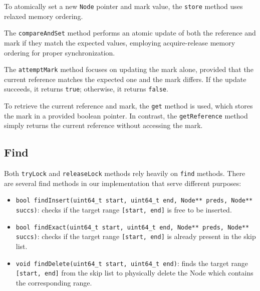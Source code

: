 To atomically set a new \texttt{Node} pointer and mark value, the \texttt{store} method uses relaxed memory ordering.

The \texttt{compareAndSet} method performs an atomic update of both the reference and mark if they match the expected values, employing acquire-release memory ordering for proper synchronization.

The \texttt{attemptMark} method focuses on updating the mark alone, provided that the current reference matches the expected one and the mark differs. If the update succeeds, it returns \texttt{true}; otherwise, it returns \texttt{false}.

To retrieve the current reference and mark, the \texttt{get} method is used, which stores the mark in a provided boolean pointer. In contrast, the \texttt{getReference} method simply returns the current reference without accessing the mark.

\begin{figure}[!p]
    \centering
    
\end{figure}

\clearpage

\subsection{Find}\label{subsec:find}

Both \texttt{tryLock} and \texttt{releaseLock} methods rely heavily on \texttt{find} methods.
There are several find methods in our implementation that serve different purposes:

\begin{itemize}
    \item \texttt{bool findInsert(uint64\_t start, uint64\_t end, Node** preds, Node** succs)}: checks if the target range \texttt{[start, end]} is free to be inserted.

    \item \texttt{bool findExact(uint64\_t start, uint64\_t end, Node** preds, Node** succs)}: checks if the target range \texttt{[start, end]} is already present in the skip list.

    \item \texttt{void findDelete(uint64\_t start, uint64\_t end)}: finds the target range \texttt{[start, end]} from the skip list to physically delete the Node which contains the corresponding range.
\end{itemize}

